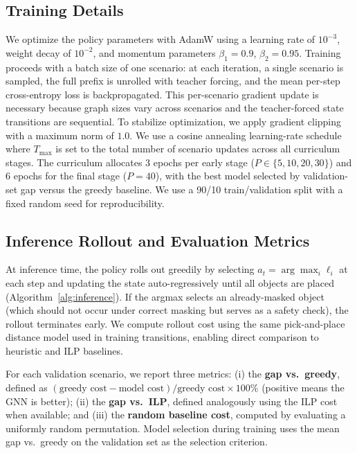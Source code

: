 \documentclass[conference]{IEEEtran}
\begin{document}
\subsection{Training Details}
We optimize the policy parameters with AdamW \cite{loshchilov2019adamw} using a learning rate of $10^{-3}$, weight decay of $10^{-2}$, and momentum parameters $\beta_1{=}0.9$, $\beta_2{=}0.95$.
Training proceeds with a batch size of one scenario: at each iteration, a single scenario is sampled, the full prefix is unrolled with teacher forcing, and the mean per-step cross-entropy loss is backpropagated. This per-scenario gradient update is necessary because graph sizes vary across scenarios and the teacher-forced state transitions are sequential.
To stabilize optimization, we apply gradient clipping with a maximum norm of $1.0$.
We use a cosine annealing learning-rate schedule where $T_{\max}$ is set to the total number of scenario updates across all curriculum stages.
The curriculum allocates 3 epochs per early stage ($P \in \{5, 10, 20, 30\}$) and 6 epochs for the final stage ($P{=}40$), with the best model selected by validation-set gap versus the greedy baseline.
We use a 90/10 train/validation split with a fixed random seed for reproducibility.

\subsection{Inference Rollout and Evaluation Metrics}
At inference time, the policy rolls out greedily by selecting $a_t = \arg\max_i \ell_i$ at each step and updating the state auto-regressively until all objects are placed (Algorithm~\ref{alg:inference}).
If the argmax selects an already-masked object (which should not occur under correct masking but serves as a safety check), the rollout terminates early.
We compute rollout cost using the same pick-and-place distance model used in training transitions, enabling direct comparison to heuristic and ILP baselines.

For each validation scenario, we report three metrics: (i) the \textbf{gap vs.\ greedy}, defined as $(\text{greedy cost} - \text{model cost}) / \text{greedy cost} \times 100\%$ (positive means the GNN is better); (ii) the \textbf{gap vs.\ ILP}, defined analogously using the ILP cost when available; and (iii) the \textbf{random baseline cost}, computed by evaluating a uniformly random permutation. Model selection during training uses the mean gap vs.\ greedy on the validation set as the selection criterion.
\end{document}
